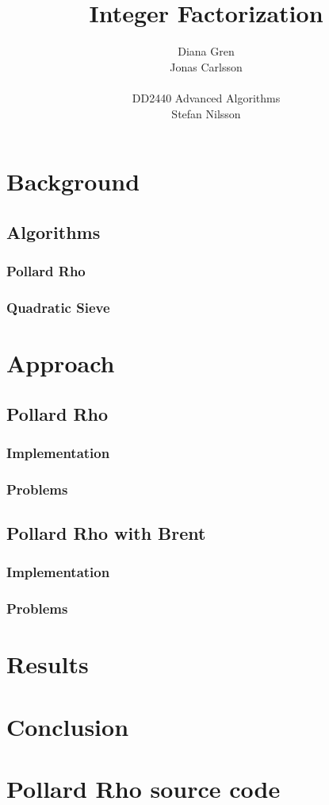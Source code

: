 \documentclass[a4paper, 12pt]{report}
\title{Integer Factorization}
\author{Diana Gren \\ Jonas Carlsson \\\\ DD2440 Advanced Algorithms \\ Stefan Nilsson}
\date{}
\begin{document}
\maketitle
\tableofcontents
\newpage
\chapter{Background}
\section{Algorithms}
\subsection{Pollard Rho}
\subsection{Quadratic Sieve}


\chapter{Approach}
\section{Pollard Rho}
\subsection{Implementation}
\subsection{Problems}

\section{Pollard Rho with Brent}
\subsection{Implementation}
\subsection{Problems}

\chapter{Results}
\chapter{Conclusion}
\appendix
\chapter{Pollard Rho source code}
\end{document}
